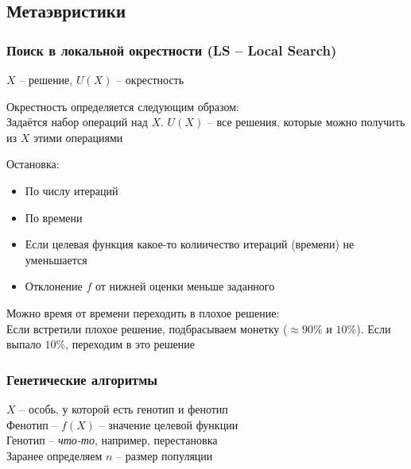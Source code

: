 \subsection{Метаэвристики}

\subsubsection{Поиск в локальной окрестности (LS -- Local Search)}

$ X $ -- решение, $ U(X) $ -- окрестность

\begin{definition}
	Окрестность определяется следующим образом: \\
    Задаётся набор операций над $ X $. $ U(X) $ -- все решения, которые можно получить из $ X $ этими операциями
\end{definition}

Остановка:
\begin{itemize}
	\item По числу итераций
    \item По времени
    \item Если целевая функция какое-то колиичество итераций (времени) не уменьшается
    \item Отклонение $ f $ от нижней оценки меньше заданного
\end{itemize}

Можно время от времени переходить в плохое решение: \\
Если встретили плохое решение, подбрасываем монетку ($ \approx 90 \% $ и $ 10 \% $). Если выпало $ 10 \% $, переходим в это решение

\subsubsection{Генетические алгоритмы}

$ X $ -- особь, у которой есть генотип и фенотип \\
Фенотип -- $ f(X) $ -- значение целевой функции \\
Генотип -- \textit{что-то}, например, перестановка \\
Заранее определяем $ n $ -- размер популяции

